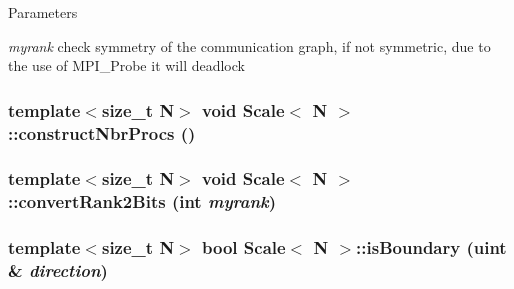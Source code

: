 \begin{DoxyParams}{Parameters}
\item[{\em myrank}]check symmetry of the communication graph, if not symmetric, due to the use of MPI\_\-Probe it will deadlock \end{DoxyParams}
\hypertarget{classScale_ac022f89a6d1e9dcd4e6380d39e5d6fdd}{
\subsubsection[{constructNbrProcs}]{\setlength{\rightskip}{0pt plus 5cm}template$<$size\_\-t N$>$ void {\bf Scale}$<$ N $>$::constructNbrProcs ()}}
\label{classScale_ac022f89a6d1e9dcd4e6380d39e5d6fdd}
\hypertarget{classScale_aab804122485a038184899d95b7c1bea4}{
\subsubsection[{convertRank2Bits}]{\setlength{\rightskip}{0pt plus 5cm}template$<$size\_\-t N$>$ void {\bf Scale}$<$ N $>$::convertRank2Bits (int {\em myrank})}}
\label{classScale_aab804122485a038184899d95b7c1bea4}
\hypertarget{classScale_acfcd50192078b937a19be52c1c6099a1}{
\subsubsection[{isBoundary}]{\setlength{\rightskip}{0pt plus 5cm}template$<$size\_\-t N$>$ bool {\bf Scale}$<$ N $>$::isBoundary (uint \& {\em direction})}}
\label{classScale_acfcd50192078b937a19be52c1c6099a1}


